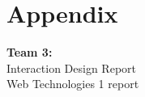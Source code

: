 \newpage
\section{Appendix}
\textbf{Team 3:}
\\Interaction Design Report
\\Web Technologies 1 report